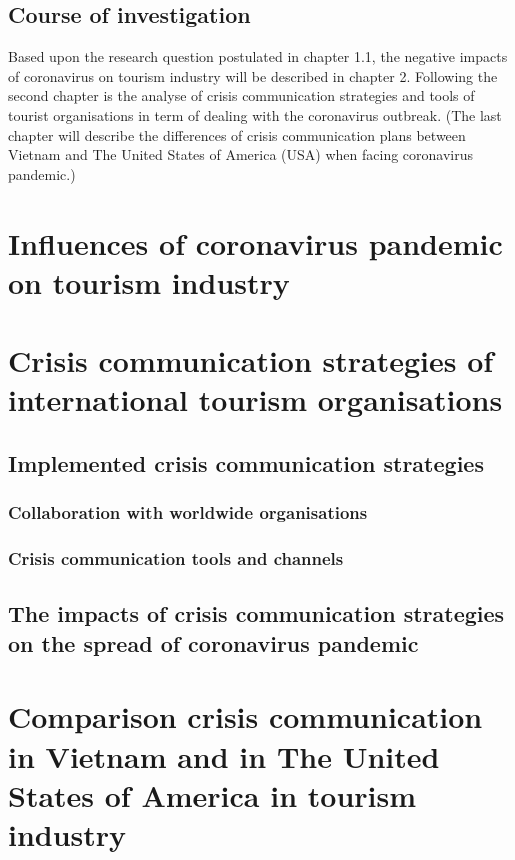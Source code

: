 \documentclass[draft=false
              ,paper=a4
              ,twoside=false
              ,fontsize=12pt
              ,headsepline
              ,BCOR10mm
              ,DIV11
              ]{scrbook}
\begin{document}
\section{Course of investigation}

Based upon the research question postulated in chapter 1.1, the negative impacts of coronavirus on tourism industry will be described in chapter 2. Following the second chapter is the analyse of crisis communication strategies and tools of tourist organisations in term of dealing with the coronavirus outbreak. (The last chapter will describe the differences of crisis communication plans between Vietnam and The United States of America (USA) when facing coronavirus pandemic.)

\chapter{Influences of coronavirus pandemic on tourism industry}

\chapter{Crisis communication strategies of international tourism organisations}

\section{Implemented crisis communication strategies}
\subsection{Collaboration with worldwide organisations}
\subsection{Crisis communication tools and channels}

\section{The impacts of crisis communication strategies on the spread of coronavirus pandemic}

\chapter{Comparison crisis communication in Vietnam and in The United States of America in tourism industry}

\printbibliography
\end{document}

